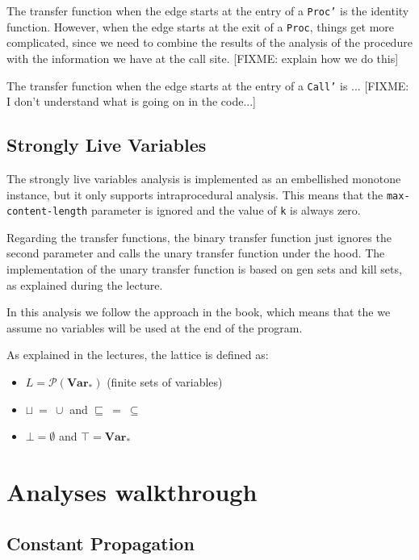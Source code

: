 \documentclass{article}
\begin{document}
The transfer function when the edge starts at the entry of a \texttt{Proc'} is the identity function. However, when the edge starts at the exit of a \texttt{Proc}, things get more complicated, since we need to combine the results of the analysis of the procedure with the information we have at the call site. [FIXME: explain how we do this]

The transfer function when the edge starts at the entry of a \texttt{Call'} is ... [FIXME: I don't understand what is going on in the code...]

\subsection*{Strongly Live Variables}

The strongly live variables analysis is implemented as an embellished monotone instance, but it only supports intraprocedural analysis. This means that the \texttt{max-content-length} parameter is ignored and the value of \texttt{k} is always zero.

Regarding the transfer functions, the binary transfer function just ignores the second parameter and calls the unary transfer function under the hood. The implementation of the unary transfer function is based on gen sets and kill sets, as explained during the lecture.

In this analysis we follow the approach in the book, which means that the we assume no variables will be used at the end of the program.

As explained in the lectures, the lattice is defined as:

\begin{itemize}
	\item $L = \mathcal{P}(\mathbf{Var_*})$ (finite sets of variables)
	\item $\sqcup\ =\ \cup$ and $\sqsubseteq\ =\ \subseteq$
	\item $\bot = \emptyset$ and $\top = \mathbf{Var_*}$
\end{itemize}

\section{Analyses walkthrough}

\subsection*{Constant Propagation}
\end{document}
